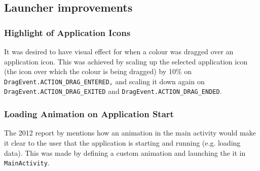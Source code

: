 \subsection{Launcher improvements}

\subsubsection{Highlight of Application Icons}
It was desired to have visual effect for when a colour was dragged over an application icon.
This was achieved by scaling up the selected application icon (the icon over which the colour is being dragged) by 10\% on \lstinline{DragEvent.ACTION_DRAG_ENTERED,} and scaling it down again on \lstinline{DragEvent.ACTION_DRAG_EXITED} and \lstinline{DragEvent.ACTION_DRAG_ENDED}.

\subsubsection{Loading Animation on Application Start}
The 2012 report by \citet{launcher2012} mentions how an animation in the main activity would make it clear to the user that the application is starting and running (e.g. loading data).
This was made by defining a custom animation and launching the it in \lstinline{MainActivity}. 

